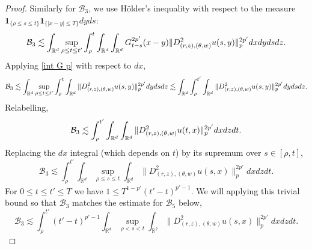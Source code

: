 \documentclass[12pt]{article}
\def\cB{\mathcal{B}}
\def\bR{\mathbb{R}}
\newcommand{\les}{\lesssim}
\begin{document}
\begin{proof}
Similarly for $\cB_3$, we use H\"older's inequality with respect to the measure $\mathbf 1_{\{\rho \leq s \leq t\}} \mathbf 1_{\{|x-y| \leq T\}}dyds$:
\[
 \cB_3 \les \int_{\bR^d} \sup_{\rho \leq t \leq t'} \int_\rho^t \int_{\bR^d} \int_{\bR^d} G^{2p'}_{t-s}(x-y) \|D^2_{(r,z),(\theta,w)}u(s,y)\|^{2p'}_{p}  dx dy ds dz. \\
\]
Applying \eqref{int G p} with respect to $dx$,
\[
 \cB_3 \les \int_{\bR^d} \sup_{\rho \leq t\leq t'} \int_\rho^t \int_{\bR^d} \|D^2_{(r,z),(\theta,w)}u(s,y)\|^{2p'}_{p} dy ds dz \les \int_{\bR^d} \int_\rho^{t'} \int_{\bR^d} \|D^2_{(r,z),(\theta,w)}u(s,y)\|^{2p'}_{p} dy ds dz. \\
\]
Relabelling, 
\[
 \cB_3 \les \int_\rho^{t'} \int_{\bR^d} \int_{\bR^d} \|D^2_{(r,z),(\theta,w)}u(t,x)\|^{2p'}_{p} dx dz dt. \\
\]
Replacing the $dx$ integral (which depends on $t$) by its supremum over $s \in [\rho, t]$,
\[
 \cB_3 \les \int_\rho^{t'} \int_{\bR^d} \sup_{\rho \leq s \leq t} \int_{\bR^d} \|D^2_{(r,z),(\theta,w)}u(s,x)\|^{2p'}_{p} dx dz dt. 
\]
For $0 \leq t \leq t' \leq T$ we have $1 \leq T^{1-p'}(t'-t)^{p'-1}$. We will applying this trivial bound so that $\cB_3$ matches the estimate for $\cB_5$ below, 
\[
 \cB_3 \les \int_\rho^{t'} (t'-t)^{p'-1} \int_{\bR^d} \sup_{\rho<s<t} \int_{\bR^2} \|D^2_{(r,z),(\theta,w)}u(s,x)\|^{2p'}_{p} dx dz dt.
\]


\end{proof}
\end{document}
